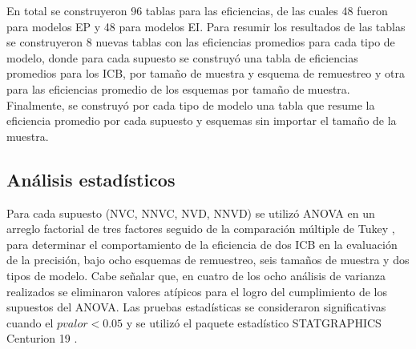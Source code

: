 En total se construyeron 96 tablas para las eficiencias, de las cuales 48 fueron para modelos EP y 48 para modelos EI. Para resumir los resultados de las tablas se construyeron 8 nuevas tablas con las eficiencias promedios para cada tipo de modelo, donde para cada supuesto se construyó una tabla de eficiencias promedios para los ICB, por tamaño de muestra y esquema de remuestreo y otra para las eficiencias promedio de los esquemas por tamaño de muestra.\\

Finalmente, se construyó por cada tipo de modelo una tabla que resume la eficiencia promedio por cada supuesto y esquemas sin importar el tamaño de la muestra.\\


\subsection{Análisis estadísticos}
Para cada supuesto (NVC, NNVC, NVD, NNVD) se utilizó ANOVA en un arreglo factorial de tres factores seguido de la comparación múltiple de Tukey \parencite{montgomery-2017}, para determinar el comportamiento de la eficiencia de dos ICB en la evaluación de la precisión, bajo ocho esquemas de remuestreo, seis tamaños de muestra y dos tipos de modelo. Cabe señalar que, en cuatro de los ocho análisis de varianza realizados se eliminaron valores atípicos para el logro del cumplimiento de los supuestos del ANOVA.
Las pruebas estadísticas se consideraron significativas cuando el $pvalor<0.05$  y se utilizó el paquete estadístico STATGRAPHICS Centurion 19 \parencite{statgraphics-2024} .




